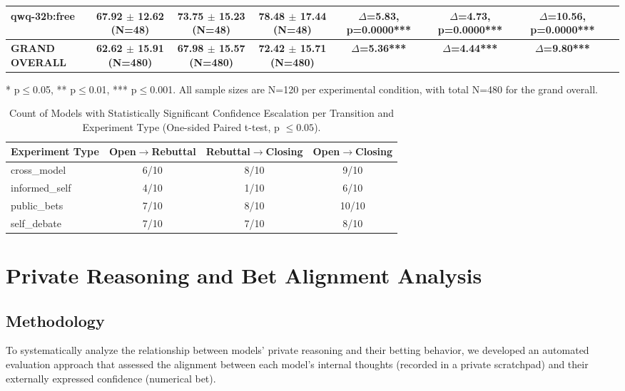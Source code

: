 \documentclass{article}
\begin{document}
\begin{table}[htbp]
{\begin{tabular}{lccccccc}
    qwq-32b:free & 67.92 $\pm$ 12.62 (N=48) & 73.75 $\pm$ 15.23 (N=48) & 78.48 $\pm$ 17.44 (N=48) & $\Delta$=5.83, p=0.0000*** & $\Delta$=4.73, p=0.0000*** & $\Delta$=10.56, p=0.0000*** \\
    \midrule
    \textbf{GRAND OVERALL} & \textbf{62.62 $\pm$ 15.91 (N=480)} & \textbf{67.98 $\pm$ 15.57 (N=480)} & \textbf{72.42 $\pm$ 15.71 (N=480)} & \textbf{$\Delta$=5.36***} & \textbf{$\Delta$=4.44***} & \textbf{$\Delta$=9.80***} \\
    \bottomrule
  \end{tabular}
  }
  \vspace{0.2cm}
  \footnotesize{* p$\leq$0.05, ** p$\leq$0.01, *** p$\leq$0.001. All sample sizes are N=120 per experimental condition, with total N=480 for the grand overall.}
\end{table}


\begin{table}[htbp]
  \centering
  \caption{Count of Models with Statistically Significant Confidence Escalation per Transition and Experiment Type (One-sided Paired t-test, p $\leq 0.05$).}
  \label{tab:sig_escalation_summary}
  \begin{tabular}{lccc}
    \toprule
    \textbf{Experiment Type} & \textbf{Open$\rightarrow$Rebuttal} & \textbf{Rebuttal$\rightarrow$Closing} & \textbf{Open$\rightarrow$Closing} \\
    \midrule
    cross\_model    & 6/10 & 8/10 & 9/10 \\
    informed\_self  & 4/10 & 1/10 & 6/10 \\
    public\_bets    & 7/10 & 8/10 & 10/10 \\
    self\_debate    & 7/10 & 7/10 & 8/10 \\
    \bottomrule
  \end{tabular}
\end{table}

\section{Private Reasoning and Bet Alignment Analysis}
\label{appendix:bet_alignment}

\subsection{Methodology}
\label{appendix:bet_alignment_methodology}

To systematically analyze the relationship between models' private reasoning and their betting behavior, we developed an automated evaluation approach that assessed the alignment between each model's internal thoughts (recorded in a private scratchpad) and their externally expressed confidence (numerical bet).
\end{document}
